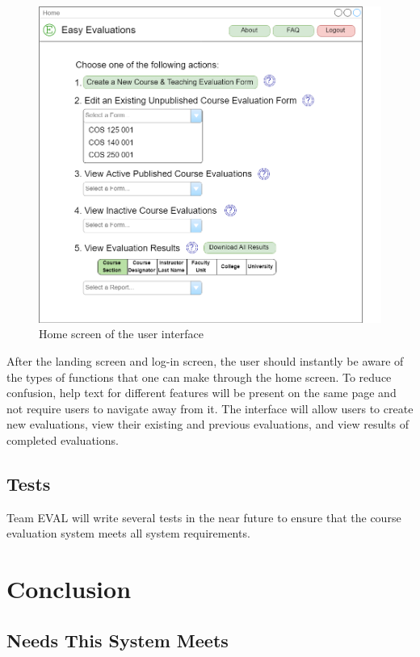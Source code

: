 \documentclass{article}
\begin{document}
\begin{center}
\begin{figure}[H]
    \centering
    \caption{Home screen of the user interface}
    \includegraphics[width=5.5in]{images/home_screen.png}
\end{figure}
\end{center}

After the landing screen and log-in screen, the user should instantly be aware of the types of functions that one can make through the home screen. To reduce confusion, help text for different features will be present on the same page and not require users to navigate away from it.  The interface will allow users to create new evaluations, view their existing and previous evaluations, and view results of completed evaluations.

\subsection{Tests}

Team EVAL will write several tests in the near future to ensure that the course evaluation system meets all system requirements.

\section{Conclusion}

\subsection{Needs This System Meets}
\end{document}
